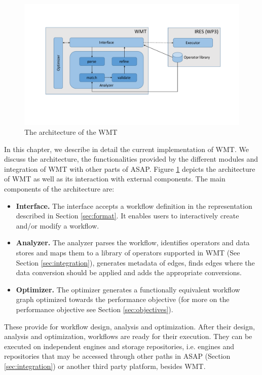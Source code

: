 \documentclass[12pt,openany,onecolumn]{book}
\begin{document}
\begin{figure}[h]
\centering
\includegraphics[width=\linewidth]{figs/architect}
\caption{The architecture of the WMT}\label{fig:architect}
\end{figure}

In this chapter, we describe in detail the current implementation of WMT. We discuss the architecture, the functionalities provided by the different modules and integration of WMT with other parts of ASAP. Figure \ref{fig:architect} depicts the architecture of WMT as well as its interaction with external components. The main components of the architecture are:
\begin{itemize}
\item \textbf{Interface.} The interface accepts a workflow definition in the representation described in Section \ref{sec:format}. It enables users to interactively create and/or modify a workflow.

\item \textbf{Analyzer.} The analyzer parses the workflow, identifies operators and data stores and maps them to a library of operators supported in WMT (See Section \ref{sec:integration}), generates metadata of edges, finds edges where the data conversion should be applied and adds the appropriate conversions.

\item \textbf{Optimizer.} The optimizer generates a functionally equivalent workflow graph optimized towards the performance objective (for more on the performance objective see Section \ref{sec:objectives}). 
\end{itemize}

These provide for workflow design, analysis and optimization. After their design, analysis and optimization, workflows are ready for their execution. They can be executed on independent engines and storage repositories, i.e. engines and repositories that may be accessed through other paths in ASAP (Section \ref{sec:integration}) or another third party platform, besides WMT.
\end{document}
